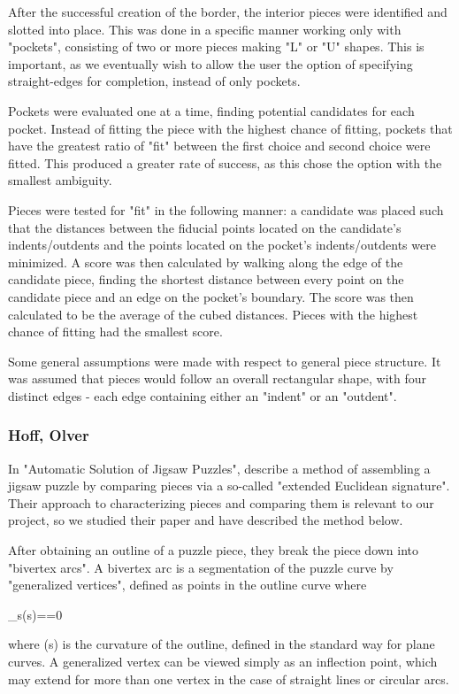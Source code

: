 \documentclass[12pt]{report}
\begin{document}
After the successful creation of the border, the interior pieces were identified and slotted into place. This was done in a specific manner working only with "pockets", consisting of two or more pieces making "L" or "U" shapes. This is important, as we eventually wish to allow the user the option of specifying straight-edges for completion, instead of only pockets. 

Pockets were evaluated one at a time, finding potential candidates for each pocket. Instead of fitting the piece with the highest chance of fitting, pockets that have the greatest ratio of "fit" between the first choice and second choice were fitted. This produced a greater rate of success, as this chose the option with the smallest ambiguity.

Pieces were tested for "fit" in the following manner: a candidate was placed such that the distances between the fiducial points located on the candidate's indents/outdents and the points located on the pocket's indents/outdents were minimized. A score was then calculated by walking along the edge of the candidate piece, finding the shortest distance between every point on the candidate piece and an edge on the pocket's boundary. The score was then calculated to be the average of the cubed distances. Pieces with the highest chance of fitting had the smallest score.

Some general assumptions were made with respect to general piece structure. It was assumed that pieces would follow an overall rectangular shape, with four distinct edges - each edge containing either an "indent" or an "outdent". 

\subsubsection*{Hoff, Olver}
In "Automatic Solution of Jigsaw Puzzles", \citeauthor{hoff} \cite{hoff} describe a method of assembling a jigsaw puzzle by comparing pieces via a so-called "extended Euclidean signature". Their approach to characterizing pieces and comparing them is relevant to our project, so we studied their paper and have described the method below.

After obtaining an outline of a puzzle piece, they break the piece down into "bivertex arcs". A bivertex arc is a segmentation of the puzzle curve by "generalized vertices", defined as points in the outline curve where
\begin{large_eq}
\kappa_s(s)==0
\end{large_eq}
where (s) is the curvature of the outline, defined in the standard way for plane curves. A generalized vertex can be viewed simply as an inflection point, which may extend for more than one vertex in the case of straight lines or circular arcs.
\end{document}
